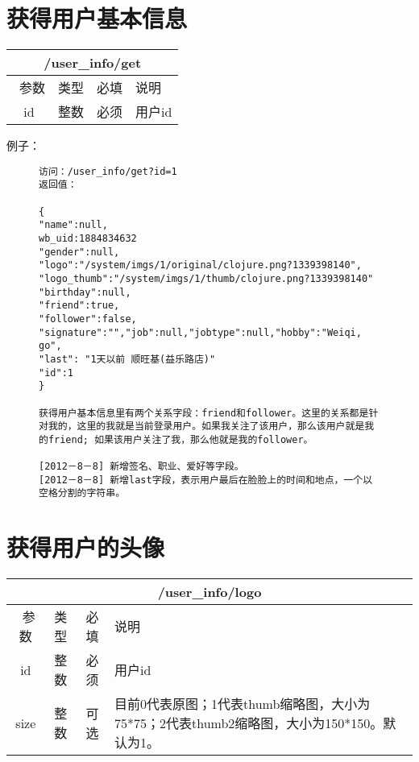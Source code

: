 \documentclass[cs4size]{ctexartutf8}
\begin{document}
\section{获得用户基本信息}

\begin{table}[H]
   \begin{center}
\begin{tabular}{|c|c|c|p{12cm}|}
\hline
\multicolumn{4}{|c|}{/user\_info/get} \\
\hline\hline
 \  参数  & 类型 & 必填 &  说明  \\
\hline
 id  & 整数 & 必须 &  用户id\\
\hline
\end{tabular}
   \end{center}
\end{table}



例子：

\begin{figure}[H]
\begin{verbatim}
访问：/user_info/get?id=1
返回值：

{
"name":null,
wb_uid:1884834632
"gender":null,
"logo":"/system/imgs/1/original/clojure.png?1339398140",
"logo_thumb":"/system/imgs/1/thumb/clojure.png?1339398140"
"birthday":null,
"friend":true,
"follower":false,
"signature":"","job":null,"jobtype":null,"hobby":"Weiqi, go",
"last": "1天以前 顺旺基(益乐路店)" 
"id":1
}

获得用户基本信息里有两个关系字段：friend和follower。这里的关系都是针对我的，这里的我就是当前登录用户。如果我关注了该用户，那么该用户就是我的friend; 如果该用户关注了我，那么他就是我的follower。

[2012－8－8] 新增签名、职业、爱好等字段。
[2012－8－8] 新增last字段，表示用户最后在脸脸上的时间和地点，一个以空格分割的字符串。

\end{verbatim}
\end{figure}


\section{获得用户的头像}

\begin{table}[H]
   \begin{center}
\begin{tabular}{|c|c|c|p{12cm}|}
\hline
\multicolumn{4}{|c|}{/user\_info/logo} \\
\hline\hline
 \  参数  & 类型 & 必填 &  说明  \\
\hline
 id  & 整数 & 必须 &  用户id\\
\hline
 size  & 整数 & 可选 &  目前0代表原图；1代表thumb缩略图，大小为75*75；2代表thumb2缩略图，大小为150*150。默认为1。\\ 
\hline
\end{tabular}
   \end{center}
\end{table}
\end{document}
